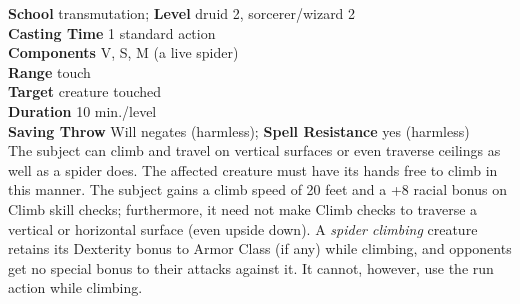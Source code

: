 \textbf{School} transmutation; \textbf{Level} druid 2, sorcerer/wizard 2\\
\textbf{Casting Time} 1 standard action\\
\textbf{Components} V, S, M (a live spider)\\
\textbf{Range} touch\\
\textbf{Target} creature touched\\
\textbf{Duration} 10 min./level\\
\textbf{Saving Throw }Will negates (harmless); \textbf{Spell Resistance} yes (harmless)\\
The subject can climb and travel on vertical surfaces or even traverse ceilings as well as a spider does. The affected creature must have its hands free to climb in this manner. The subject gains a climb speed of 20 feet and a +8 racial bonus on Climb skill checks; furthermore, it need not make Climb checks to traverse a vertical or horizontal surface (even upside down). A \textit{spider climbing }creature retains its Dexterity bonus to Armor Class (if any) while climbing, and opponents get no special bonus to their attacks against it. It cannot, however, use the run action while climbing.\\
